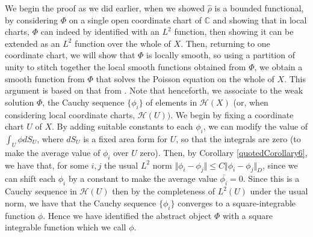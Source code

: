 \documentclass[11pt]{report}
\theoremstyle{definition}
\begin{document}
We begin the proof as we did earlier, when we showed $\hat{\rho}$ is a bounded functional, by considering $\Phi$ on a single open coordinate chart of $\mathbb{C}$ and showing that in local charts, $\Phi$ can indeed by identified with an $L^2$ function, then showing it can be extended as an $L^2$ function over the whole of $X$. Then, returning to one coordinate chart, we will show that $\Phi$ is locally smooth, so using a partition of unity to stitch together the local smooth functions obtained from $\Phi$, we obtain a smooth function from $\Phi$ that solves the Poisson equation on the whole of $X$. This argument is based on that from \cite[(Chapter 10)]{donaldson}. Note that henceforth, we associate to the weak solution $\Phi$, the Cauchy sequence $\{\phi_i\}$ of elements in $\mathcal{H}(X)$ (or, when considering local coordinate charts, $\mathcal{H}(U))$.
We begin by fixing a coordinate chart $U$ of $X$. By adding suitable constants to each $\phi_i$, we can modify the value of $\int_{U} \phi dS_{U}$, where $dS_{U}$ is a fixed area form for $U$, so that the integrals are zero (to make the average value of $\phi_i$ over $U$ zero). Then, by Corollary \ref{quotedCorollary6}, we have that, for some $i,j$ the usual $L^2$ norm $\Vert \phi_i - \phi_j\Vert \leq C \Vert \phi_i - \phi_j\Vert_D$, since we can shift each $\phi_i$ by a constant to make the average value $\overline{\phi_i}=0$. Since this is a Cauchy sequence in $\mathcal{H}(U)$ then by the completeness of $L^2(U)$ under the usual norm, we have that the Cauchy sequence $\{\phi_i\}$ converges to a square-integrable function $\phi$. Hence we have identified the abstract object $\Phi$ with a square integrable function which we call $\phi$.
\end{document}
